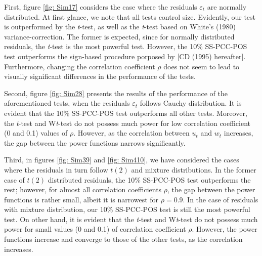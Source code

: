 \documentclass[harvard,11pt]{article}
\begin{document}
First, figure \ref{fig: Sim17} considers the case where the residuals $\varepsilon_t$ are normally distributed. At first glance, we note that all tests control size. Evidently, our test is outperformed by the \textit{t}-test, as well as the \textit{t}-test based on White's (1980) variance-correction. The former is expected, since for normally distributed residuals, the \textit{t}-test is the most powerful test. However, the 10\% SS-PCC-POS test outperforms the sign-based procedure porposed by \citet{dufour1995exact} [CD (1995) hereafter]. Furthermore, changing the correlation coefficient $\rho$ does not seem to lead to visually significant differences in the performance of the tests.
 
Second, figure \ref{fig: Sim28} presents the results of the performance of the aforementioned tests, when the residuals $\varepsilon_t$ follows Cauchy distribution. It is evident that the 10\% SS-PCC-POS test outperforms all other tests. Moreover, the \textit{t}-test and W\textit{t}-test do not possess much power for low correlation coefficient (0 and 0.1) values of $\rho$. However, as the correlation between $u_t$ and $w_t$ increases, the gap between the power functions narrows significantly.  

Third, in figures \ref{fig: Sim39} and \ref{fig: Sim410}, we have considered the cases where the residuals in turn follow $t(2)$ and mixture distributions. In the former case of $t(2)$ distributed residuals, the 10\% SS-PCC-POS test outperforms the rest; however, for almost all correlation coefficients $\rho$, the gap between the power functions is rather small, albeit it is narrowest for $\rho=0.9$. In the case of residuals with mixture distribution, our 10\% SS-PCC-POS test is still the most powerful test. On other hand, it is evident that the \textit{t}-test and W\textit{t}-test do not possess much power for small values (0 and 0.1) of correlation coefficient $\rho$. However, the power functions increase and converge to those of the other tests, as the correlation increases.
\end{document}
